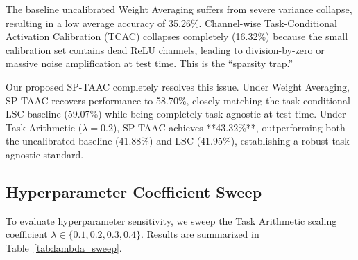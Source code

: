\documentclass{article}
\theoremstyle{plain}
\theoremstyle{definition}
\theoremstyle{remark}
\begin{document}
The baseline uncalibrated Weight Averaging suffers from severe variance collapse, resulting in a low average accuracy of 35.26\%. Channel-wise Task-Conditional Activation Calibration (TCAC) collapses completely (16.32\%) because the small calibration set contains dead ReLU channels, leading to division-by-zero or massive noise amplification at test time. This is the ``sparsity trap.''

Our proposed SP-TAAC completely resolves this issue. Under Weight Averaging, SP-TAAC recovers performance to 58.70\%, closely matching the task-conditional LSC baseline (59.07\%) while being completely task-agnostic at test-time. Under Task Arithmetic ($\lambda = 0.2$), SP-TAAC achieves **43.32\%**, outperforming both the uncalibrated baseline (41.88\%) and LSC (41.95\%), establishing a robust task-agnostic standard.

\subsection{Hyperparameter Coefficient Sweep}
To evaluate hyperparameter sensitivity, we sweep the Task Arithmetic scaling coefficient $\lambda \in \{0.1, 0.2, 0.3, 0.4\}$. Results are summarized in Table~\ref{tab:lambda_sweep}.
\end{document}
